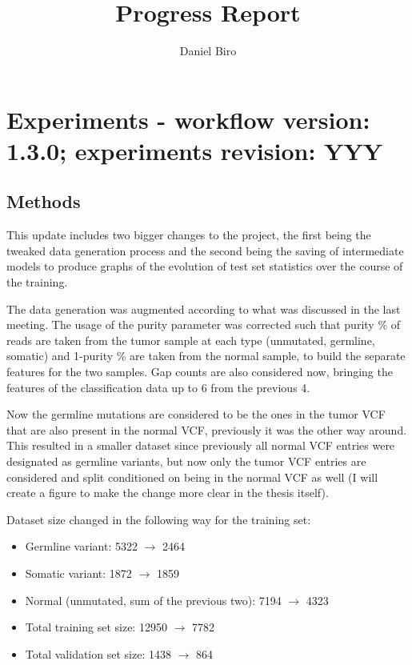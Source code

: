 \documentclass[11pt, a4paper]{article}
\begin{document}
\title{ {{ Progress Report }}  }
\author{  {{ Daniel Biro }}  }
\maketitle

\tableofcontents
\clearpage
%	
\section{ Experiments - workflow version: 1.3.0; experiments revision: YYY }

\subsection{Methods}

This update includes two bigger changes to the project, the first being the tweaked data generation process and the second being the saving of intermediate models to produce graphs of the evolution of test set statistics over the course of the training.

The data generation was augmented according to what was discussed in the last meeting. The usage of the purity parameter was corrected such that purity \% of reads are taken from the tumor sample at each type (unmutated, germline, somatic) and 1-purity \% are taken from the normal sample, to build the separate features for the two samples. Gap counts are also considered now, bringing the features of the classification data up to 6 from the previous 4. 

Now the germline mutations are considered to be the ones in the tumor VCF that are also present in the normal VCF, previously it was the other way around. This resulted in a smaller dataset since previously all normal VCF entries were designated as germline variants, but now only the tumor VCF entries are considered and split conditioned on being in the normal VCF as well (I will create a figure to make the change more clear in the thesis itself).

Dataset size changed in the following way for the training set:

\begin{itemize}

\item Germline variant: 5322 $ \rightarrow $ 2464
\item Somatic variant: 1872 $ \rightarrow $ 1859
\item Normal (unmutated, sum of the previous two): 7194 $ \rightarrow $ 4323
\item Total training set size: 12950 $ \rightarrow $ 7782
\item Total validation set size: 1438 $ \rightarrow $ 864

\end{itemize}
\end{document}
